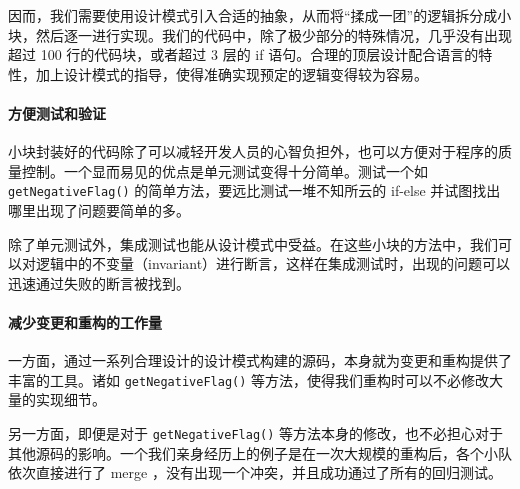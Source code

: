因而，我们需要使用设计模式引入合适的抽象，从而将“揉成一团”的逻辑拆分成小块，然后逐一进行实现。我们的代码中，除了极少部分的特殊情况，几乎没有出现超过 100 行的代码块，或者超过 3 层的 if 语句。合理的顶层设计配合语言的特性，加上设计模式的指导，使得准确实现预定的逻辑变得较为容易。

\paragraph{方便测试和验证} 小块封装好的代码除了可以减轻开发人员的心智负担外，也可以方便对于程序的质量控制。一个显而易见的优点是单元测试变得十分简单。测试一个如 \lstinline{getNegativeFlag()} 的简单方法，要远比测试一堆不知所云的 if-else 并试图找出哪里出现了问题要简单的多。

除了单元测试外，集成测试也能从设计模式中受益。在这些小块的方法中，我们可以对逻辑中的不变量（invariant）进行断言，这样在集成测试时，出现的问题可以迅速通过失败的断言被找到。

\paragraph{减少变更和重构的工作量} 一方面，通过一系列合理设计的设计模式构建的源码，本身就为变更和重构提供了丰富的工具。诸如 \lstinline{getNegativeFlag()} 等方法，使得我们重构时可以不必修改大量的实现细节。

另一方面，即便是对于 \lstinline{getNegativeFlag()} 等方法本身的修改，也不必担心对于其他源码的影响。一个我们亲身经历上的例子是在一次大规模的重构后，各个小队依次直接进行了 merge ，没有出现一个冲突，并且成功通过了所有的回归测试。



